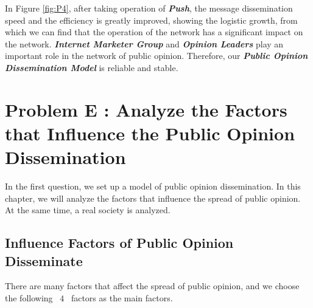 \documentclass[a4paper,11pt]{article}
\begin{document}
\par In Figure \ref{fig:P4}, after taking operation of \textbf{\emph{Push}}, the message dissemination speed and the efficiency is greatly improved, showing the logistic growth, from which we can find that the operation of the network has a significant impact on the network. \textbf{\emph{Internet Marketer Group}} and \textbf{\emph{Opinion Leaders}} play an important role in the network of public opinion. Therefore, our \textbf{\emph{Public Opinion Dissemination Model}} is reliable and stable.









\section{Problem E : Analyze the Factors that Influence the Public Opinion Dissemination}
\par In the first question, we set up a model of public opinion dissemination. In this chapter, we will analyze the factors that influence the spread of public opinion. At the same time, a real society is analyzed.
\subsection{Influence Factors of Public Opinion Disseminate}
\par There are many factors that affect the spread of public opinion, and we choose the following ~$4$~ factors as the main factors.
\end{document}
